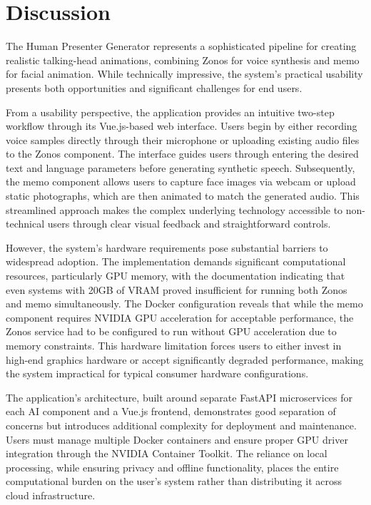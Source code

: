 \section{Discussion}

The Human Presenter Generator represents a sophisticated pipeline for creating realistic
talking-head animations, combining \gls{Zonos} for voice synthesis and \gls{memo} for facial
animation. While technically impressive, the system's practical usability presents both
opportunities and significant challenges for end users.

From a usability perspective, the application provides an intuitive two-step workflow through its
Vue.js-based web interface. Users begin by either recording voice samples directly through their
microphone or uploading existing audio files to the \gls{Zonos} component. The interface guides
users through entering the desired text and language parameters before generating synthetic speech.
Subsequently, the \gls{memo} component allows users to capture face images via webcam or upload
static photographs, which are then animated to match the generated audio. This streamlined approach
makes the complex underlying technology accessible to non-technical users through clear visual
feedback and straightforward controls.

However, the system's hardware requirements pose substantial barriers to widespread adoption. The
implementation demands significant computational resources, particularly GPU memory, with the
documentation indicating that even systems with 20GB of VRAM proved insufficient for running both
\gls{Zonos} and \gls{memo} simultaneously. The Docker configuration reveals that while the
\gls{memo} component requires NVIDIA GPU acceleration for acceptable performance, the \gls{Zonos}
service had to be configured to run without GPU acceleration due to memory constraints. This
hardware limitation forces users to either invest in high-end graphics hardware or accept
significantly degraded performance, making the system impractical for typical consumer hardware
configurations.

The application's architecture, built around separate FastAPI microservices for each AI component
and a Vue.js frontend, demonstrates good separation of concerns but introduces additional complexity
for deployment and maintenance. Users must manage multiple Docker containers and ensure proper GPU
    driver integration through the NVIDIA Container Toolkit. The reliance on local processing, while
    ensuring privacy and offline functionality, places the entire computational burden on the user's
    system rather than distributing it across cloud infrastructure.


